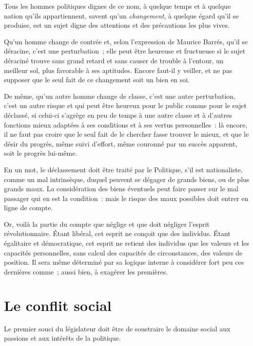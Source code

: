\documentclass[french,twoside]{book} %
\newcommand{\astermono}{\medskip\centerline{\color{rubric}\large\selectfont{\syms ✻}}\medskip\par}%
\begin{document}
\noindent Tous les hommes politiques dignes de ce nom, à quelque temps et à quelque nation qu’ils appartiennent, savent qu’un \emph{changement}, à quelque égard qu’il se produise, est un sujet digne des attentions et des précautions les plus vives.\par
Qu’un homme change de contrée et, selon l’expression de Maurice Barrés, qu’il se déracine, c’est une perturbation ; elle peut être heureuse et fructueuse si le sujet déraciné trouve sans grand retard et sans causer de trouble à l’entour, un meilleur sol, plus favorable à ses aptitudes. Encore faut-il y veiller, et ne pas supposer que le seul fait de ce changement soit un bien en soi.\par
De même, qu’un autre homme change de classe, c’est une autre perturbation, c’est un autre risque et qui peut être heureux pour le public comme pour le sujet déclassé, si celui-ci s’agrège en peu de temps à une autre classe et à d’autres fonctions mieux adaptées à ses conditions et à ses vertus personnelles : là encore, il ne faut pas croire que le seul fait de le chercher fasse trouver le mieux, et que le désir du progrès, même suivi d’effort, même couronné par un succès apparent, soit le progrès lui-même.\par
En un mot, le déclassement doit être traité par le Politique, s’il est nationaliste, comme un mal intrinsèque, duquel peuvent se dégager de grands biens, ou de plus grands maux. La considération des biens éventuels peut faire passer sur le mal passager qui en est la condition : mais le risque des maux possibles doit entrer en ligne de compte.\par

\astermono

\noindent Or, voilà la partie du compte que néglige et que doit négliger l’esprit révolutionnaire. Étant libéral, cet esprit ne conçoit que des individus. Étant égalitaire et démocratique, cet esprit ne retient des individus que les valeurs et les capacités personnelles, sans calcul des capacités de circonstances, des valeurs de position. Il sera même déterminé par sa logique interne à considérer fort peu ces dernières comme ; aussi bien, à exagérer les premières.
\section[{Le conflit social}]{Le conflit social}
\noindent Le premier souci du législateur doit être de soustraire le domaine social aux passions et aux intérêts de la politique.\par
\end{document}
